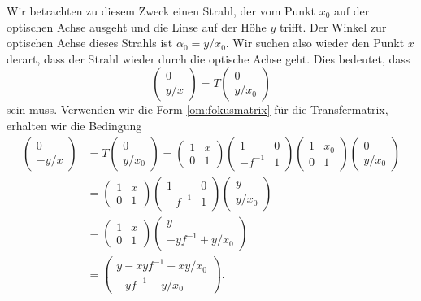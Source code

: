 Wir betrachten zu diesem Zweck einen Strahl, der vom Punkt $x_0$ 
auf der optischen Achse ausgeht und die Linse auf der Höhe $y$ 
trifft.
Der Winkel zur optischen Achse dieses Strahls ist $\alpha_0=y/x_0$.
Wir suchen also wieder den Punkt $x$ derart, dass der Strahl
wieder durch die optische Achse geht.
Dies bedeutet, dass
\[
\begin{pmatrix} 0\\ y/x \end{pmatrix}
=
T
\begin{pmatrix} 0\\ y/x_0 \end{pmatrix}
\]
sein muss.
Verwenden wir die Form \eqref{om:fokusmatrix} für die Transfermatrix,
erhalten wir die Bedingung
\begin{align*}
\begin{pmatrix}0\\-y/x\end{pmatrix}
&=
T
\begin{pmatrix}0\\ y/x_0\end{pmatrix}
=
\begin{pmatrix}1&x\\0&1\end{pmatrix}
\begin{pmatrix}1&0\\-f^{-1}&1\end{pmatrix}
\begin{pmatrix}1&x_0\\0&1\end{pmatrix}
\begin{pmatrix}0\\ y/x_0\end{pmatrix}
\\
&=
\begin{pmatrix}1&x\\0&1\end{pmatrix}
\begin{pmatrix}1&0\\-f^{-1}&1\end{pmatrix}
\begin{pmatrix}y\\y/x_0\end{pmatrix}
\\
&=
\begin{pmatrix}1&x\\0&1\end{pmatrix}
\begin{pmatrix}y\\ -yf^{-1}+y/x_0\end{pmatrix}
\\
&=
\begin{pmatrix} y-xyf^{-1}+xy/x_0\\ -yf^{-1}+y/x_0 \end{pmatrix}.
\end{align*}
